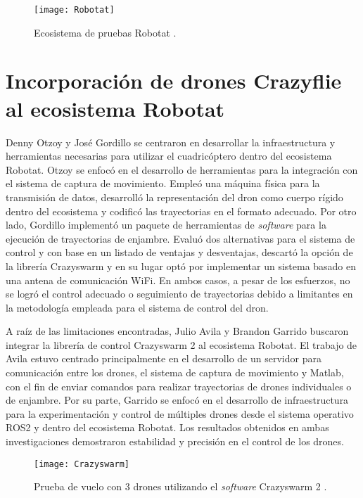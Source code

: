 \vspace{0.3cm} %
\begin{figure}[htbp]
	\centering
	\texttt{[image: Robotat]}
	\caption{Ecosistema de pruebas Robotat \cite{Parafan2022_tesis}.}
	\label{fig:Robotat}
\end{figure}

\section{Incorporación de drones Crazyflie al ecosistema Robotat}
Denny Otzoy \cite{Otzoy2023_tesis} y José Gordillo \cite{Gordillo2023_tesis} se centraron en desarrollar la infraestructura y herramientas necesarias para utilizar el cuadricóptero dentro del ecosistema Robotat. Otzoy se enfocó en el desarrollo de herramientas para la integración con el sistema de captura de movimiento. Empleó una máquina física para la transmisión de datos, desarrolló la representación del dron como cuerpo rígido dentro del ecosistema y codificó las trayectorias en el formato adecuado. Por otro lado, Gordillo implementó un paquete de herramientas de \textit{software} para la ejecución de trayectorias de enjambre. Evaluó dos alternativas para el sistema de control y con base en un listado de ventajas y desventajas, descartó la opción de la librería Crazyswarm y en su lugar optó por implementar un sistema basado en una antena de comunicación WiFi. En ambos casos, a pesar de los esfuerzos, no se logró el control adecuado o seguimiento de trayectorias debido a limitantes en la metodología empleada para el sistema de control del dron. 

A raíz de las limitaciones encontradas, Julio Avila \cite{Avila2023_tesis} y Brandon Garrido \cite{Garrido2023_tesis} buscaron integrar la librería de control Crazyswarm 2 al ecosistema Robotat. El trabajo de Avila estuvo centrado principalmente en el desarrollo de un servidor para comunicación entre los drones, el sistema de captura de movimiento y Matlab, con el fin de enviar comandos para realizar trayectorias de drones individuales o de enjambre. Por su parte, Garrido se enfocó en el desarrollo de infraestructura para la experimentación y control de múltiples drones desde el sistema operativo ROS2 y dentro del ecosistema Robotat. Los resultados obtenidos en ambas investigaciones demostraron estabilidad y precisión en el control de los drones. 

\vspace{0.5cm} %
\begin{figure}[htbp]
	\centering
	\texttt{[image: Crazyswarm]}
	\caption{Prueba de vuelo con 3 drones utilizando el \textit{software} Crazyswarm 2 \cite{Garrido2023_tesis}.}
	\label{fig:Crazyswarm}
\end{figure}
\vspace{0.4cm} %

